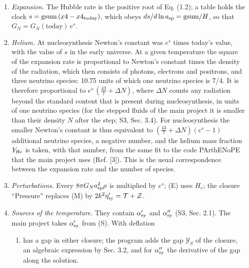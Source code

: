 \documentclass[
  10pt,
]{article}
\providecommand{\tightlist}{%
  \setlength{\itemsep}{0pt}\setlength{\parskip}{0pt}}
\begin{document}
\begin{enumerate}
\def\labelenumi{\arabic{enumi}.}
\tightlist
\item
  \emph{Expansion.} The Hubble rate is the positive root of Eq. (1.2); a
  table holds the clock \(s=\mathrm{gsum}\,(x4-x4_{\rm today})\), which
  obeys \(ds/d\ln a_{\rm sp}=\mathrm{gsum}/H\), so that
  \(G_N=G_N(\text{today})\,e^{s}\).
\item
  \emph{Helium.} At nucleosynthesis Newton's constant was \(e^{s}\)
  times today's value, with the value of \(s\) in the early universe. At
  a given temperature the square of the expansion rate is proportional
  to Newton's constant times the density of the radiation, which then
  consists of photons, electrons and positrons, and three neutrino
  species: 10.75 units of which one neutrino species is 7/4. It is
  therefore proportional to \(e^{s}\,(\tfrac{43}{7}+\Delta N)\), where
  \(\Delta N\) counts any radiation beyond the standard content that is
  present during nucleosynthesis, in units of one neutrino species (for
  the stepped fluids of the main project it is smaller than their
  density \(N\) after the step; S3, Sec. 3.4). For nucleosynthesis the
  smaller Newton's constant is thus equivalent to
  \((\tfrac{43}{7}+\Delta N)(e^{s}-1)\) additional neutrino species, a
  negative number, and the helium mass fraction \(Y_{\rm He}\) is taken,
  with that number, from the same fit to the code PArthENoPE that the
  main project uses (Ref. {[}3{]}). This is the usual correspondence
  between the expansion rate and the number of species.
\item
  \emph{Perturbations.} Every \(8\pi G_Na_{\rm sp}^2\rho\) is multiplied
  by \(e^{s}\); (E) uses \(H_e\); the closure ``Pressure'' replaces (M)
  by \(2k^2\eta_{\rm sy}'=\mathcal T+\mathcal Z\).
\item
  \emph{Sources of the temperature.} They contain \(\alpha_{\rm sy}'\)
  and \(\alpha_{\rm sy}''\) (S3, Sec. 2.1). The main project takes
  \(\alpha_{\rm sy}'\) from (S). With deflation

  \begin{enumerate}
  \def\labelenumii{(\Alph{enumii})}
  \setcounter{enumii}{18}
  \tightlist
  \item
    has a gap in either closure; the program adds the gap
    \(\mathcal Y_S\) of the closure, an algebraic expression by Sec.
    3.2, and for \(\alpha_{\rm sy}''\) the derivative of the gap along
    the solution.
  \end{enumerate}
\end{enumerate}
\end{document}
